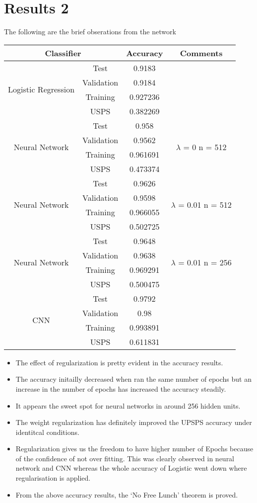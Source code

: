 \documentclass[a4paper,11pt]{article}
\begin{document}
\section*{Results 2}
The following are the brief obserations from the network
\begin{center}
	\begin{tabular}{|c|c|c|c|}
		\hline
		\multicolumn{2}{|c|}{Classifier} & Accuracy & Comments\\
		\hline
		\multirow{4}{*}{Logistic Regression} & Test &0.9183& \\
		&Validation&0.9184&\\
		& Training&0.927236&\\
		& USPS &0.382269&\\
		\hline
			\multirow{4}{*}{Neural Network} & Test &0.958& \multirow{4}{*}{$\lambda$ = 0 n = 512}\\
		&Validation&0.9562&\\
		& Training&0.961691&\\
		& USPS & 0.473374&\\
		\hline
		\multirow{4}{*}{Neural Network} & Test &0.9626&\multirow{4}{*}{$\lambda$ = 0.01 n = 512} \\
		&Validation&0.9598&\\
		& Training&0.966055&\\
		& USPS & 0.502725&\\
		\hline
		\multirow{4}{*}{Neural Network} & Test &0.9648&\multirow{4}{*}{$\lambda$ = 0.01 n = 256} \\
		&Validation&0.9638&\\
		& Training&0.969291&\\
		& USPS & 0.500475&\\
		\hline
			\multirow{4}{*}{CNN} & Test &0.9792& \\
		&Validation&0.98&\\
		& Training&0.993891&\\
		& USPS &0.611831&\\
		\hline
	\end{tabular}
\end{center}
\begin{itemize}
 \item The effect of regularization is pretty evident in the accuracy results.
 \item The accuracy initailly decreased when ran the same number of epochs but an increase in the number of epochs has increased the accuracy steadily.
 \item It appears the sweet spot for neural networks in around 256 hidden units.
 \item The weight regularization has definitely improved the UPSPS accuracy under identitcal conditions.
 \item Regularization gives us the freedom to have higher number of Epochs because of the confidence of not over fitting. This was clearly observed in neural network and CNN whereas the whole accuracy of Logistic went down where regularisation is applied.
 \item From the above accuracy results, the `No Free Lunch' theorem is proved.
\end{itemize}
\end{document}
